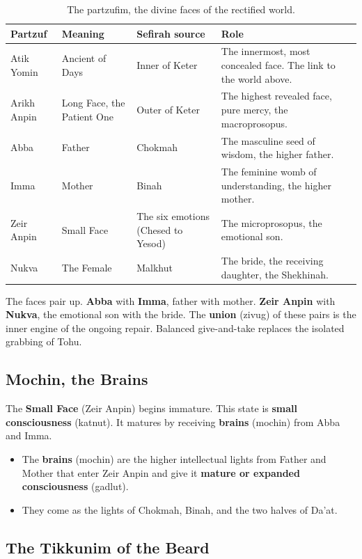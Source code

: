 \begin{longtable}{l L{3.0cm} L{2.4cm} L{4.2cm}}
\caption{The partzufim, the divine faces of the rectified world.}\\
\toprule
\textbf{Partzuf} & \textbf{Meaning} & \textbf{Sefirah source} & \textbf{Role} \\
\midrule
Atik Yomin & Ancient of Days & Inner of Keter & The innermost, most concealed face. The link to the world above. \\
Arikh Anpin & Long Face, the Patient One & Outer of Keter & The highest revealed face, pure mercy, the macroprosopus. \\
Abba & Father & Chokmah & The masculine seed of wisdom, the higher father. \\
Imma & Mother & Binah & The feminine womb of understanding, the higher mother. \\
Zeir Anpin & Small Face & The six emotions (Chesed to Yesod) & The microprosopus, the emotional son. \\
Nukva & The Female & Malkhut & The bride, the receiving daughter, the Shekhinah. \\
\bottomrule
\end{longtable}

The faces pair up. \textbf{Abba} with \textbf{Imma}, father with mother. \textbf{Zeir Anpin} with
\textbf{Nukva}, the emotional son with the bride. The \textbf{union} (zivug) of these pairs is the inner
engine of the ongoing repair. Balanced give-and-take replaces the isolated grabbing of Tohu.

\subsection{Mochin, the Brains}

The \textbf{Small Face} (Zeir Anpin) begins immature. This state is \textbf{small consciousness}
(katnut). It matures by receiving \textbf{brains} (mochin) from Abba and Imma.

\begin{itemize}
 \item The \textbf{brains} (mochin) are the higher intellectual lights from Father and Mother that enter
 Zeir Anpin and give it \textbf{mature or expanded consciousness} (gadlut).
 \item They come as the lights of Chokmah, Binah, and the two halves of Da'at.
\end{itemize}

\subsection{The Tikkunim of the Beard}

